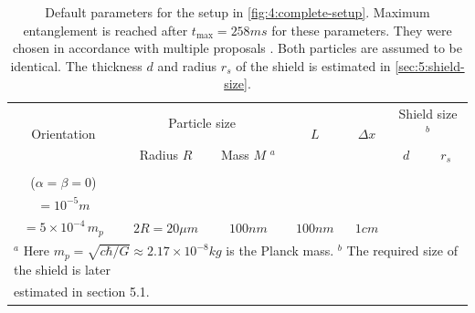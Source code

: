 \begin{table}[!t]
  \centering
  \begin{adjustbox}{max width=\textwidth}
    \begin{tabularx}{\textwidth}{c c c c c c c}
      \toprule
      \multirow{2}{*}{Orientation} & \multicolumn{2}{c}{Particle size} & \multirow{2}{*}{$L$} & \multirow{2}{*}{$\Delta x$} & \multicolumn{2}{c}{Shield size $^b$} \\ \cline{2-3} \cline{6-7}
      & Radius $R$ & Mass $M$ $^a$ & & & $d$ & $r_s$\\
      \midrule
      \begin{tabular}{@{}c@{}}Parallel \\ ($\alpha=\beta=0$) \end{tabular} & \begin{tabular}{@{}c@{}}$10\si{\mu m}$ \\ $=10^{-5}\si{m}$\end{tabular} & \begin{tabular}{@{}c@{}}$\approx 10^{-11}\si{kg}$ \\ $=5\times 10^{-4} \, m_p$\end{tabular} & $2R=20\si{\mu m}$ & $100\si{nm}$ & $100\si{nm}$ & $1\si{cm}$ \\
      \bottomrule
      \multicolumn{7}{l}{\footnotesize $^a$ Here $m_p = \sqrt{c\hbar/G}\approx 2.17\times 10^{-8}\si{kg}$ is the Planck mass. $^b$ The required size of the shield is later} \\[-4pt]
      \multicolumn{7}{l}{\footnotesize estimated in section 5.1.} \\[5pt]
    \end{tabularx}
  \end{adjustbox}
  \caption{Default parameters for the setup in \cref{fig:4:complete-setup}. Maximum entanglement is reached after $t_\mathrm{max} = 258\si{ms}$ for these parameters. They were chosen in accordance with multiple proposals \cite{Aspelmeyer_2024,Rijavec_2021}. Both particles are assumed to be identical. The thickness $d$ and radius $r_s$ of the shield is estimated in \cref{sec:5:shield-size}.}
  \label{tab:paramters}
\end{table}

